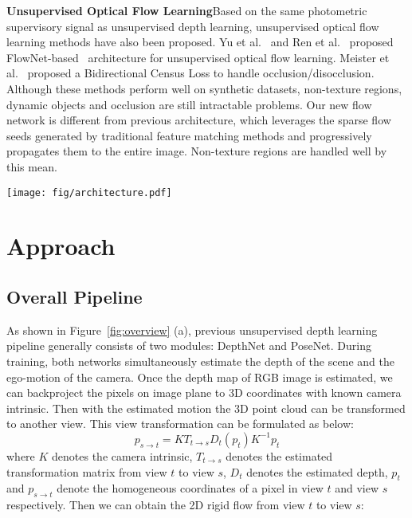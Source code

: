 \documentclass[10pt,twocolumn,letterpaper]{article}
\begin{document}
\textbf{Unsupervised Optical Flow Learning}\quad Based on the same photometric supervisory signal as unsupervised depth learning, unsupervised optical flow learning methods have also been proposed. Yu et al.~\cite{jason2016back} and Ren et al.~\cite{ren2017unsupervised} proposed FlowNet-based~\cite{ilg2017flownet} architecture for unsupervised optical flow learning. Meister et al.~\cite{meister2018unflow} proposed a Bidirectional Census Loss to handle occlusion/disocclusion. Although these methods perform well on synthetic datasets, non-texture regions, dynamic objects and occlusion are still intractable problems. Our new flow network is different from previous architecture, which leverages the sparse flow seeds generated by traditional feature matching methods and progressively propagates them to the entire image. Non-texture regions are handled well by this mean.

\begin{figure*}
\begin{center}
  \texttt{[image: fig/architecture.pdf]}
\end{center}
   \vspace{-3mm}
   \caption{Overview of previous pipeline (a) and our pipeline (b). The supervisory signal of previous pipeline is based on appearance matching of two images, which is unstable and suffers from non-texture regions. We use the optical flow results generated by our flow estimation network SF-Net as supervision and modify the input of PoseNet.}
\label{fig:overview}
\vspace{-2mm}
\end{figure*}


\section{Approach}

\subsection{Overall Pipeline}

As shown in Figure~\ref{fig:overview} (a), previous unsupervised depth learning pipeline generally consists of two modules: DepthNet and PoseNet. During training, both networks simultaneously estimate the depth of the scene and the ego-motion of the camera. Once the depth map of RGB image is estimated, we can backproject the pixels on image plane to 3D coordinates with known camera intrinsic. Then with the estimated motion the 3D point cloud can be transformed to another view. This view transformation can be formulated as below:
\begin{equation}
    p_{s\xrightarrow{}t} = KT_{t\xrightarrow{}s}D_t(p_t)K^{-1}p_{t}
    \label{equ:flow}
\end{equation}
where $K$ denotes the camera intrinsic, $T_{t\xrightarrow{}s}$ denotes the estimated transformation matrix from view $t$ to view $s$, $D_t$ denotes the estimated depth, $p_t$ and $p_{s\xrightarrow{}t}$ denote the homogeneous coordinates of a pixel in view $t$ and view $s$ respectively. Then we can obtain the 2D rigid flow from view $t$ to view $s$:
\end{document}
